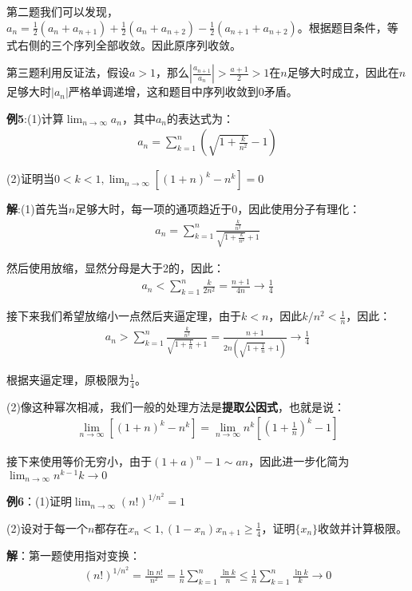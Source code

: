 \documentclass{ctexart}
\let\oldtextbf\textbf %
\renewcommand{\textbf}[1]{\textcolor{btex}{\oldtextbf{#1}}} %
\begin{document}
第二题我们可以发现，$a_n=\frac{1}{2}(a_n+a_{n+1})+\frac{1}{2}(a_n+a_{n+2})-\frac{1}{2}(a_{n+1}+a_{n+2})$。根据题目条件，等式右侧的三个序列全部收敛。因此原序列收敛。

第三题利用反证法，假设$a>1$，那么$|\frac{a_{n+1}}{a_n}|>\frac{a+1}{2}>1$在$n$足够大时成立，因此在$n$足够大时$|a_n|$严格单调递增，这和题目中序列收敛到0矛盾。

\textbf{\color{btex}例5}:(1)计算$\lim_{n\to\infty}a_n$，其中$a_n$的表达式为：
\begin{align*}
    a_n=\sum_{k=1}^n\left(\sqrt{1+\frac{k}{n^2}}-1\right)
\end{align*}

(2)证明当$0<k<1,\lim_{n\to\infty}[(1+n)^k-n^k]=0$

\textbf{\color{btex}解}:(1)首先当$n$足够大时，每一项的通项趋近于0，因此使用分子有理化：
\begin{align*}
    a_n=\sum_{k=1}^n\frac{\frac{k}{n^2}}{\sqrt{1+\frac{k}{n^2}}+1}
\end{align*}

然后使用放缩，显然分母是大于2的，因此：
\begin{align*}
    a_n<\sum_{k=1}^n\frac{k}{2n^2}=\frac{n+1}{4n}\to\frac{1}{4}
\end{align*}

接下来我们希望放缩小一点然后夹逼定理，由于$k<n$，因此$k/n^2<\frac{1}{n}$，因此：
\begin{align*}
    a_n>\sum_{k=1}^n\frac{\frac{k}{n^2}}{\sqrt{1+\frac{1}{n}}+1}=\frac{n+1}{2n(\sqrt{1+\frac{1}{n}}+1)}\to\frac{1}{4}
\end{align*}

根据夹逼定理，原极限为$\frac{1}{4}$。

(2)像这种幂次相减，我们一般的处理方法是\textbf{提取公因式}，也就是说：
\begin{align*}
    \lim_{n\to\infty}[(1+n)^k-n^k]=\lim_{n\to\infty}n^k[(1+\frac{1}{n})^k-1]
\end{align*}

接下来使用等价无穷小，由于$(1+a)^n-1\sim an$，因此进一步化简为$\lim_{n\to\infty}n^{k-1}k\to0$

\textbf{例6}：(1)证明$\lim_{n\to\infty}(n!)^{1/n^2}=1$

(2)设对于每一个$n$都存在$x_n<1,(1-x_n)x_{n+1}\geq\frac{1}{4}$，证明$\{x_n\}$收敛并计算极限。

\textbf{解}：第一题使用指对变换：
\begin{align*}
    (n!)^{1/n^2}=\frac{\ln n!}{n^2}=\frac{1}{n}\sum_{k=1}^n\frac{\ln k}{n}\leq\frac{1}{n}\sum_{k=1}^n\frac{\ln k}{k}\to 0
\end{align*}
\end{document}

